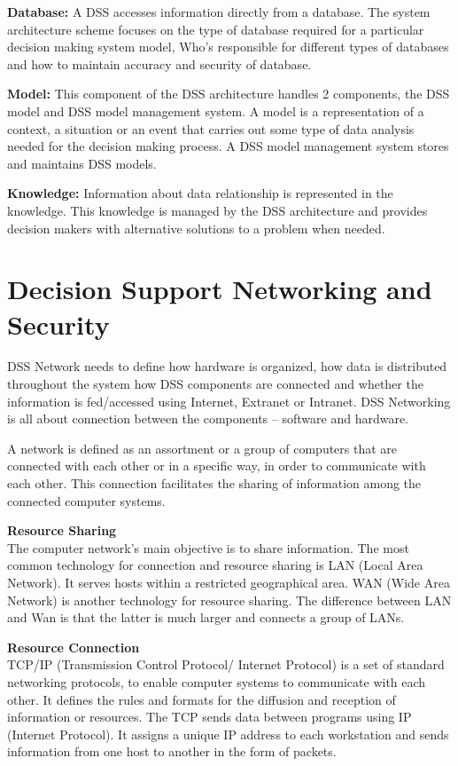 \textbf{Database: } A DSS accesses information directly from a database. The system architecture scheme focuses on the type of database required for a particular decision making system model, Who’s responsible for different types of databases and how to maintain accuracy and security of database.\cite{DSS}

\textbf{Model: }This component of the DSS architecture handles 2 components, the DSS model and DSS model management system. A model is a representation of a context, a situation or an event that carries out some type of data analysis needed for the decision making process. A DSS model management system stores and maintains DSS models.\cite{DSS}

\textbf{Knowledge: }Information about data relationship is represented in the knowledge. This knowledge is managed by the DSS architecture and provides decision makers with alternative solutions to a problem when needed.\cite{DSS} 
\section{Decision Support Networking and Security}
\label{DecisionSupportNetworkingAndSecurity}
DSS Network needs to define how hardware is organized, how data is distributed throughout the system how DSS components are connected and whether the information is fed/accessed using Internet, Extranet or Intranet.\cite{DSS} 
DSS Networking is all about connection between the components – software and hardware.

A network is defined as an assortment or a group of computers that are connected with each other or in a specific way, in order to communicate with each other. This connection facilitates the sharing of information among the connected computer systems.\cite{DSS}

\textbf{Resource Sharing}\\
The computer network's main objective is to share information. The most common technology for connection and resource sharing is LAN (Local Area Network). It serves hosts within a restricted geographical area. WAN (Wide Area Network) is another technology for resource sharing. The difference between LAN and Wan is that the latter is much larger and connects a group of LANs.\cite{DSS}

\textbf{Resource Connection}\\
TCP/IP (Transmission Control Protocol/ Internet Protocol) is a set of standard networking protocols, to enable computer systems to communicate with each other. It defines the rules and formats for the diffusion and reception of information or resources. The TCP sends data between programs using IP (Internet Protocol). It assigns a unique IP address to each workstation and sends information from one host to another in the form of packets.\cite{DSS}

